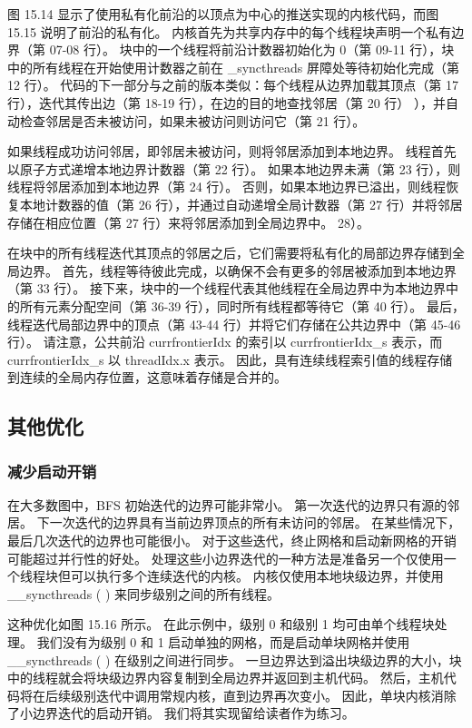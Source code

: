 图 15.14 显示了使用私有化前沿的以顶点为中心的推送实现的内核代码，而图 15.15 说明了前沿的私有化。 内核首先为共享内存中的每个线程块声明一个私有边界（第 07-08 行）。 块中的一个线程将前沿计数器初始化为 0（第 09-11 行），块中的所有线程在开始使用计数器之前在 \_syncthreads 屏障处等待初始化完成（第 12 行）。 代码的下一部分与之前的版本类似：每个线程从边界加载其顶点（第 17 行），迭代其传出边（第 18-19 行），在边的目的地查找邻居（第 20 行） ），并自动检查邻居是否未被访问，如果未被访问则访问它（第 21 行）。

如果线程成功访问邻居，即邻居未被访问，则将邻居添加到本地边界。 线程首先以原子方式递增本地边界计数器（第 22 行）。 如果本地边界未满（第 23 行），则线程将邻居添加到本地边界（第 24 行）。 否则，如果本地边界已溢出，则线程恢复本地计数器的值（第 26 行），并通过自动递增全局计数器（第 27 行）并将邻居存储在相应位置（第 27 行）来将邻居添加到全局边界中。 28）。

在块中的所有线程迭代其顶点的邻居之后，它们需要将私有化的局部边界存储到全局边界。 首先，线程等待彼此完成，以确保不会有更多的邻居被添加到本地边界（第 33 行）。 接下来，块中的一个线程代表其他线程在全局边界中为本地边界中的所有元素分配空间（第 36-39 行），同时所有线程都等待它（第 40 行）。 最后，线程迭代局部边界中的顶点（第 43-44 行）并将它们存储在公共边界中（第 45-46 行）。 请注意，公共前沿 currfrontierIdx 的索引以 currfrontierIdx\_s 表示，而 currfrontierIdx\_s 以 threadIdx.x 表示。 因此，具有连续线程索引值的线程存储到连续的全局内存位置，这意味着存储是合并的。

\subsection{其他优化}
\subsubsection{减少启动开销}
在大多数图中，BFS 初始迭代的边界可能非常小。 第一次迭代的边界只有源的邻居。 下一次迭代的边界具有当前边界顶点的所有未访问的邻居。 在某些情况下，最后几次迭代的边界也可能很小。 对于这些迭代，终止网格和启动新网格的开销可能超过并行性的好处。 处理这些小边界迭代的一种方法是准备另一个仅使用一个线程块但可以执行多个连续迭代的内核。 内核仅使用本地块级边界，并使用 \_\_syncthreads ( ) 来同步级别之间的所有线程。

这种优化如图 15.16 所示。 在此示例中，级别 0 和级别 1 均可由单个线程块处理。 我们没有为级别 0 和 1 启动单独的网格，而是启动单块网格并使用 \_\_syncthreads ( ) 在级别之间进行同步。 一旦边界达到溢出块级边界的大小，块中的线程就会将块级边界内容复制到全局边界并返回到主机代码。 然后，主机代码将在后续级别迭代中调用常规内核，直到边界再次变小。 因此，单块内核消除了小边界迭代的启动开销。 我们将其实现留给读者作为练习。

